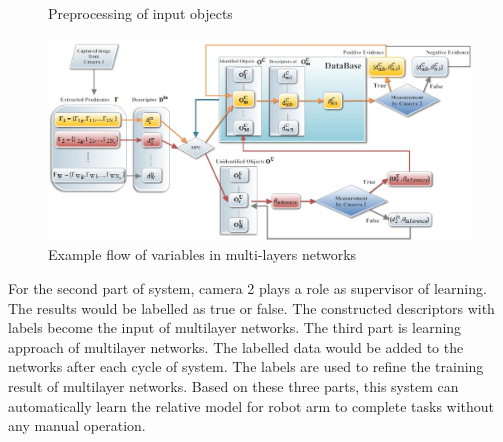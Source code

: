 \documentclass[journal]{IEEEtran}
\begin{document}
\begin{figure}[!t]
\begin{center}
\caption{Preprocessing of input objects}\label{test}
\end{center}
\end{figure}


\begin{figure}[!t]
\begin{center}
\includegraphics*[width=5 in]{j_img/fig3.jpg}
\caption{Example flow of variables in multi-layers networks}\label{test}
\end{center}
\end{figure}

For the second part of system, camera 2 plays a role as supervisor of learning. The results would be labelled as true or false. The constructed descriptors with labels become the input of multilayer networks. The third part is learning approach of multilayer networks. The labelled data would be added to the networks after each cycle of system. The labels are used to refine the training result of multilayer networks. Based on these three parts, this system can automatically learn the relative model for robot arm to complete tasks without any manual operation. 
\end{document}
